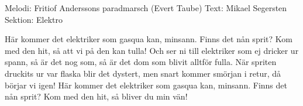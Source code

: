 \begin{song}

\begin{songmeta}
Melodi: Fritiof Anderssons paradmarsch (Evert Taube)
Text: Mikael Segersten
Sektion: Elektro
\end{songmeta}

\begin{songtext}
Här kommer det elektriker som gasqua kan, minsann.
Finns det nån sprit?
Kom med den hit, så att vi på den kan tulla!
Och ser ni till elektriker som ej dricker ur spann,
så är det nog som, så är det dom som blivit alltför fulla.
När spriten druckits ur var flaska blir det dystert, men
snart kommer smörjan i retur, då börjar vi igen!
Här kommer det elektriker som gasqua kan, minsann.
Finns det nån sprit?
Kom med den hit, så bliver du min vän!
\end{songtext}
\end{song}
